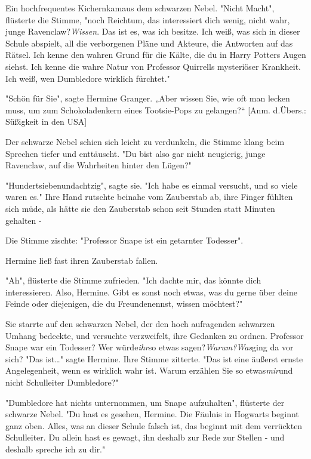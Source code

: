{Ein hochfrequentes Kichernkamaus dem schwarzen Nebel. "Nicht Macht", flüsterte die Stimme, "noch Reichtum, das interessiert dich wenig, nicht wahr, junge Ravenclaw?\emph{Wissen}. Das ist es, was ich besitze. Ich weiß, was sich in dieser Schule abspielt, all die verborgenen Pläne und Akteure, die Antworten auf das Rätsel. Ich kenne den wahren Grund für die Kälte, die du in Harry Potters Augen siehst. Ich kenne die wahre Natur von Professor Quirrells mysteriöser Krankheit. Ich weiß, wen Dumbledore wirklich fürchtet."

"Schön für Sie", sagte Hermine Granger. „Aber wissen Sie, wie oft man lecken muss, um zum Schokoladenkern eines Tootsie-Pops zu gelangen?“ {[}Anm. d.Übers.: Süßigkeit in den USA{]}

Der schwarze Nebel schien sich leicht zu verdunkeln, die Stimme klang beim Sprechen tiefer und enttäuscht. "Du bist also gar nicht neugierig, junge Ravenclaw, auf die Wahrheiten hinter den Lügen?"

"Hundertsiebenundachtzig", sagte sie. "Ich habe es einmal versucht, und so viele waren es." Ihre Hand rutschte beinahe vom Zauberstab ab, ihre Finger fühlten sich müde, als hätte sie den Zauberstab schon seit Stunden statt Minuten gehalten -

Die Stimme zischte: "Professor Snape ist ein getarnter Todesser".

Hermine ließ fast ihren Zauberstab fallen.

"Ah", flüsterte die Stimme zufrieden. "Ich dachte mir, das könnte dich interessieren. Also, Hermine. Gibt es sonst noch etwas, was du gerne über deine Feinde oder diejenigen, die du Freundenennst, wissen möchtest?"

Sie starrte auf den schwarzen Nebel, der den hoch aufragenden schwarzen Umhang bedeckte, und versuchte verzweifelt, ihre Gedanken zu ordnen. Professor Snape war ein Todesser? Wer würde\emph{ihr}so etwas sagen?\emph{Warum?Was}ging da vor sich? "Das ist…" sagte Hermine. Ihre Stimme zitterte. "Das ist eine äußerst ernste Angelegenheit, wenn es wirklich wahr ist. Warum erzählen Sie so etwas\emph{mir}und nicht Schulleiter Dumbledore?"

"Dumbledore hat nichts unternommen, um Snape aufzuhalten", flüsterte der schwarze Nebel. "Du hast es gesehen, Hermine. Die Fäulnis in Hogwarts beginnt ganz oben. Alles, was an dieser Schule falsch ist, das beginnt mit dem verrückten Schulleiter. Du allein hast es gewagt, ihn deshalb zur Rede zur Stellen - und deshalb spreche ich zu dir."

}

